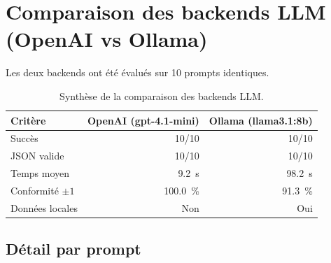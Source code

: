 \section{Comparaison des backends LLM (OpenAI vs Ollama)}

Les deux backends ont \'et\'e \'evalu\'es sur 10 prompts identiques.

\begin{table}[!htbp]
\centering
\begin{tabular}{l r r}
\toprule
\textbf{Crit\`ere} & \textbf{OpenAI (gpt-4.1-mini)} & \textbf{Ollama (llama3.1:8b)} \\
\midrule
Succ\`es & 10/10 & 10/10 \\
JSON valide & 10/10 & 10/10 \\
Temps moyen & 9.2~s & 98.2~s \\
Conformit\'e $\pm 1$ & 100.0~\% & 91.3~\% \\
Donn\'ees locales & Non & Oui \\
\bottomrule
\end{tabular}
\caption{Synth\`ese de la comparaison des backends LLM.}
\end{table}


\subsection{D\'etail par prompt}

